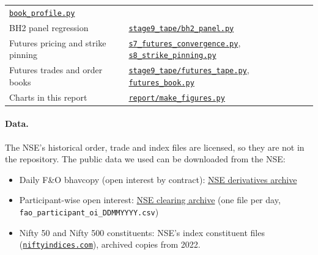 \documentclass[11pt,a4paper]{article}
\begin{document}
\begin{center}
\begin{tabularx}{\textwidth}{>{\raggedright\arraybackslash}p{5.2cm}X}
  \href{https://github.com/arnav127/nse-fut-analysis/blob/main/stage9_tape/book_profile.py}{\texttt{book\_profile.py}} \\
BH2 panel regression & \href{https://github.com/arnav127/nse-fut-analysis/blob/main/stage9_tape/bh2_panel.py}{\texttt{stage9\_tape/bh2\_panel.py}} \\
Futures pricing and strike pinning & \href{https://github.com/arnav127/nse-fut-analysis/blob/main/stage6_insights/s7_futures_convergence.py}{\texttt{s7\_futures\_convergence.py}},
  \href{https://github.com/arnav127/nse-fut-analysis/blob/main/stage6_insights/s8_strike_pinning.py}{\texttt{s8\_strike\_pinning.py}} \\
Futures trades and order books & \href{https://github.com/arnav127/nse-fut-analysis/blob/main/stage9_tape/futures_tape.py}{\texttt{stage9\_tape/futures\_tape.py}},
  \href{https://github.com/arnav127/nse-fut-analysis/blob/main/stage9_tape/futures_book.py}{\texttt{futures\_book.py}} \\
Charts in this report & \href{https://github.com/arnav127/nse-fut-analysis/blob/main/report/make_figures.py}{\texttt{report/make\_figures.py}} \\
\bottomrule
\end{tabularx}
\end{center}

\paragraph{Data.} The NSE's historical order, trade and index files are licensed, so they are not
in the repository. The public data we used can be downloaded from the NSE:
\begin{itemize}
  \item Daily F\&O bhavcopy (open interest by contract):
  \href{https://archives.nseindia.com/content/historical/DERIVATIVES/}{NSE derivatives archive}
  \item Participant-wise open interest:
  \href{https://archives.nseindia.com/content/nsccl/}{NSE clearing archive}
  (one file per day,\\ \texttt{fao\_participant\_oi\_DDMMYYYY.csv})
  \item Nifty 50 and Nifty 500 constituents: NSE's index constituent files
  (\href{https://www.niftyindices.com}{\texttt{niftyindices.com}}), archived copies from 2022.
\end{itemize}
\end{document}
